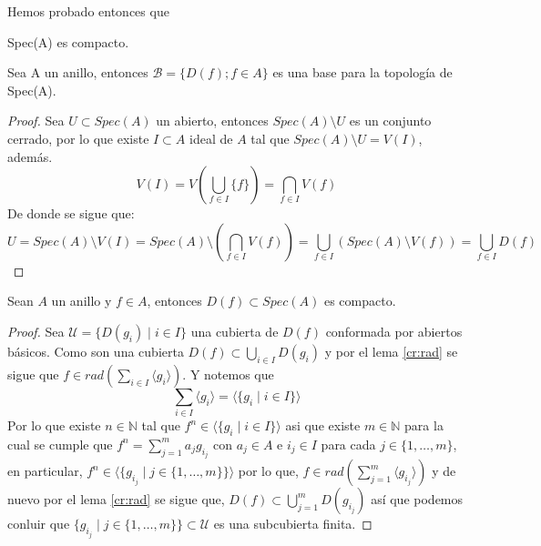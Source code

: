 \documentclass[14pt]{extarticle}
\begin{document}
Hemos probado entonces que 

\begin{corolario}{}{}
    Spec(A) es compacto.
\end{corolario}

\begin{proposicion}{}{}
    Sea A un anillo, entonces
    $\mathcal{B} = \{D(f); f\in A\}$
    es una base para la topología de Spec(A).
\end{proposicion}
\begin{proof}
    Sea $U \subset Spec(A)$ un abierto, entonces
    $Spec(A)\setminus U$ es un conjunto cerrado,
    por lo que existe $I \subset A$ ideal de $A$ tal que 
    $Spec(A)\setminus U = V(I)$, además.
    $$V(I)= V\left( \bigcup_{f\in I} \{f\}\right) = \bigcap_{f\in I}V(f)$$
    De donde se sigue que:
    $$U = Spec(A)\setminus V(I) 
    = Spec(A)\setminus\left( \bigcap_{f\in I}V(f)\right) 
    = \bigcup_{f\in I} (Spec(A)\setminus V(f))
    = \bigcup_{f \in I}D(f)$$
\end{proof}

\begin{proposicion}{}{}
    Sean $A$ un anillo y $f\in A$, entonces
    $D(f) \subset Spec(A)$ es compacto.
\end{proposicion}
\begin{proof}
    Sea $\mathcal{U}=\{D(g_i)\mid i\in I\}$ una cubierta
    de $D(f)$ conformada por abiertos básicos.
    Como son una cubierta $D(f) \subset \bigcup_{i \in I}D(g_i)$
    y por el lema \ref{cr:rad} se sigue que
    $f\in rad\left(\sum_{i\in I}\langle g_i \rangle\right)$.
    Y notemos que
    $$\sum_{i\in I}\langle g_i \rangle
    = \langle \{g_i \mid i\in I \} \rangle$$
    Por lo que existe $n \in \mathbb{N}$ tal que
    $f^n \in \langle\{g_i\mid i\in I\} \rangle$ asi que
    existe $m \in \mathbb{N}$ para la cual se cumple que
    $f^n = \sum_{j=1}^{m} a_j g_{i_j}$ con $a_j \in A$
    e $i_j \in I$ para cada $j \in \{1,\dots,m\}$, en particular,
    $f^n \in \langle \{g_{i_j}\mid j\in \{1,\dots, m\} \} \rangle$
    por lo que, 
    $f \in rad \left( \sum_{j=1}^{m} \langle g_{i_j} \rangle\right)$
    y de nuevo por el lema \ref{cr:rad} se sigue que, 
    $D(f) \subset \bigcup_{j=1}^m D(g_{i_j})$ así que podemos conluir
    que $\{g_{i_j}\mid j\in\{1,\dots,m\}\} \subset \mathcal{U}$ es una
    subcubierta finita.
\end{proof}
\end{document}
